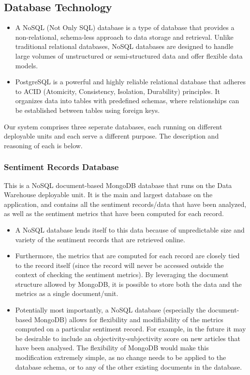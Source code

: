 \documentclass[12pt]{article}
\begin{document}
\subsection{Database Technology}
\begin{itemize}
    \item A NoSQL (Not Only SQL) database is a type of database that provides a non-relational, schema-less approach to data storage and retrieval. Unlike traditional relational databases, NoSQL databases are designed to handle large volumes of unstructured or semi-structured data and offer flexible data models.
    \item PostgreSQL is a powerful and highly reliable relational database that adheres to ACID (Atomicity, Consistency, Isolation, Durability) principles. It organizes data into tables with predefined schemas, where relationships can be established between tables using foreign keys.
\end{itemize}
Our system comprises three seperate databases, each running on different deployable units and each serve a different purpose. The description and reasoning of each is below.
\subsubsection{Sentiment Records Database}
This is a NoSQL document-based MongoDB database that runs on the Data Warehouse deployable unit. It is the main and largest database on the application, and contains all the sentiment records/data that have been analyzed, as well as the sentiment metrics that have been computed for each record.
\begin{itemize}
    \item A NoSQL database lends itself to this data because of unpredictable size and variety of the sentiment records that are retrieved online.
    \item Furthermore, the metrics that are computed for each record are closely tied to the record itself (since the record will never be accessed outside the context of checking the sentiment metrics). By leveraging the document structure allowed by MongoDB, it is possible to store both the data and the metrics as a single document/unit.
    \item Potentially most importantly, a NoSQL database (especially the document-based MongoDB) allows for flexibility and modifiability of the metrics computed on a particular sentiment record. For example, in the future it may be desirable to include an objectivity-subjectivity score on new articles that have been analysed. The flexibility of MongoDB would make this modification extremely simple, as no change needs to be applied to the database schema, or to any of the other existing documents in the database.
\end{itemize}
\end{document}
